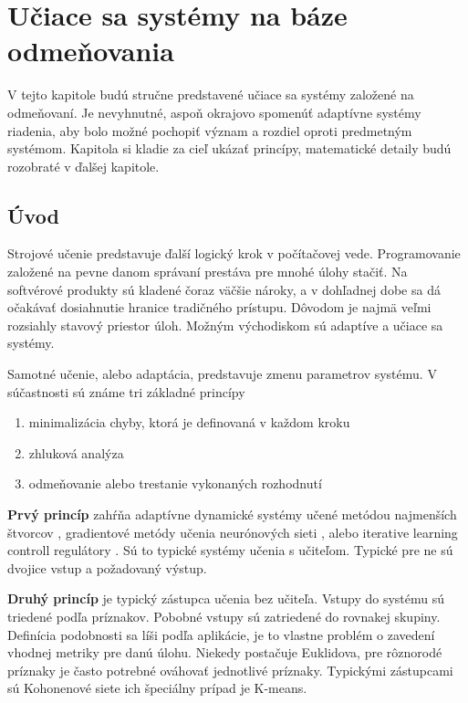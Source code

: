 \chapter{Učiace sa systémy na báze odmeňovania}

V tejto kapitole budú stručne predstavené učiace sa systémy založené na odmeňovaní.
Je nevyhnutné, aspoň okrajovo spomenúť adaptívne systémy riadenia, aby bolo možné
pochopiť význam a rozdiel oproti predmetným systémom. Kapitola si kladie za cieľ
ukázať princípy, matematické detaily budú rozobraté v ďalšej kapitole.


\section{Úvod}

Strojové učenie predstavuje ďalší logický krok v počítačovej vede. Programovanie
založené na pevne danom správaní prestáva pre mnohé úlohy stačiť. Na softvérové
produkty sú kladené čoraz väčšie nároky, a v dohľadnej dobe sa dá očakávať
dosiahnutie hranice tradičného prístupu. Dôvodom je najmä veľmi rozsiahly stavový
priestor úloh. Možným východiskom sú adaptíve a učiace sa systémy.

Samotné učenie, alebo adaptácia, predstavuje zmenu parametrov systému.
V súčastnosti sú známe tri základné princípy

\begin{enumerate}
\item minimalizácia chyby, ktorá je definovaná v každom kroku
\item zhluková analýza
\item odmeňovanie alebo trestanie vykonaných rozhodnutí
\end{enumerate}

{\bf Prvý princíp} zahŕňa adaptívne dynamické systémy učené metódou najmenších
štvorcov \cite{bib:adaptive_01} \cite{bib:adaptive_02} \cite{bib:adaptive_03},
gradientové metódy učenia neurónových sieti \cite{bib:gradient_01} \cite{bib:gradient_02}
\cite{bib:gradient_03} \cite{bib:backpropagation_00} \cite{bib:gradient_04}, alebo
iterative learning controll regulátory \cite{bib:ilc_01} \cite{bib:ilc_02}.
Sú to typické systémy učenia s učiteľom. Typické pre ne sú dvojice vstup a požadovaný
výstup.

{\bf Druhý princíp} je typický zástupca učenia bez učiteľa. Vstupy do systému
sú triedené podľa príznakov. Pobobné vstupy sú zatriedené do rovnakej skupiny.
Definícia podobnosti sa líši podľa aplikácie, je to vlastne problém o zavedení vhodnej metriky
pre danú úlohu. Niekedy postačuje Euklidova, pre rôznorodé príznaky je často
potrebné ováhovať jednotlivé príznaky. Typickými zástupcami
sú Kohonenové siete \cite{bib:kohonen_01} \cite{bib:kohonen_02} \cite{bib:kohonen_03} ich špeciálny prípad je K-means.

